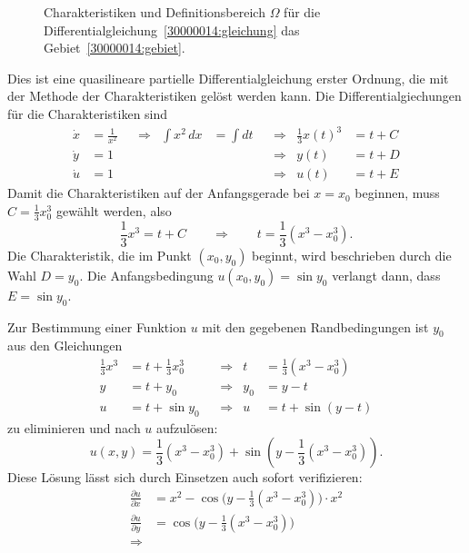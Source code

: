 \begin{loesung}
\begin{figure}
\centering
{}
\caption{Charakteristiken und Definitionsbereich $\Omega$
für die Differentialgleichung~\eqref{30000014:gleichung}
das Gebiet~\eqref{30000014:gebiet}.
\label{30000014:domain}
}
\end{figure}
Dies ist eine quasilineare partielle Differentialgleichung erster Ordnung, die
mit der Methode der Charakteristiken gelöst werden kann.
Die Differentialgiechungen für die Charakteristiken sind
\[
\begin{aligned}
\dot x &= \frac1{x^2} &&\Rightarrow& \int x^2\,dx &=\int dt &&\Rightarrow& \frac13 x(t)^3 &= t + C
\\
\dot y &= 1           &&           &              &         &&\Rightarrow& y(t) &= t + D
\\
\dot u &= 1           &&           &              &         &&\Rightarrow& u(t) &= t + E
\end{aligned}
\]
Damit die Charakteristiken auf der Anfangsgerade bei $x=x_0$ beginnen, muss
$C=\frac13x_0^3$ gewählt werden, also
\[
\frac13 x^3 = t + C
\qquad\Rightarrow\qquad
t = \frac13(x^3-x_0^3).
\]
Die Charakteristik, die im Punkt $(x_0,y_0)$ beginnt, wird beschrieben durch
die Wahl $D=y_0$.
Die Anfangsbedingung $u(x_0,y_0)=\sin y_0 $
verlangt dann, dass $E=\sin y_0 $.
\begin{teilaufgaben}
\item Zur Bestimmung einer Funktion $u$ mit den gegebenen Randbedingungen
ist $y_0$ aus den Gleichungen
\[
\begin{aligned}
{\textstyle\frac13}x^3 &= t + {\textstyle\frac13}x_0^3 &&\Rightarrow& t   &= \textstyle{\frac13}(x^3-x_0^3) \\
y           &= t + y_0          &&\Rightarrow& y_0 &= y - t              \\
u           &= t + \sin y_0     &&\Rightarrow& u   &= t + \sin(y-t)
\end{aligned}
\]
zu eliminieren und nach $u$ aufzulösen:
\[
u(x,y) = 
{\textstyle \frac13}(x^3-x_0^3)
+
\sin (y-{\textstyle \frac13}(x^3-x_0^3)).
\]
Diese Lösung lässt sich durch Einsetzen auch sofort verifizieren:
\begin{align*}
\frac{\partial u}{\partial x}
&=
x^2 -
\cos\bigl(y-{\textstyle\frac13}(x^3-x_0^3)\bigr)
\cdot x^2
\\
\frac{\partial u}{\partial y}
&=
\cos\bigl(y-{\textstyle\frac13}(x^3-x_0^3)\bigr)
\\
\Rightarrow

\end{align*}
\end{teilaufgaben}
\end{loesung}
